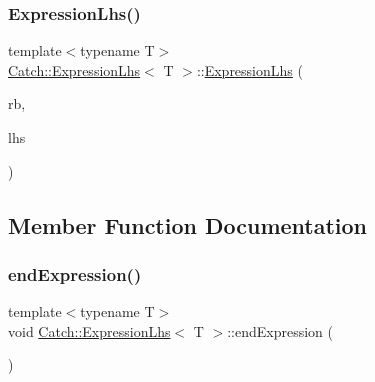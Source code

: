 \subsubsection{\texorpdfstring{Expression\+Lhs()}{ExpressionLhs()}}
{\footnotesize\ttfamily template$<$typename T$>$ \\
\hyperlink{class_catch_1_1_expression_lhs}{Catch\+::\+Expression\+Lhs}$<$ T $>$\+::\hyperlink{class_catch_1_1_expression_lhs}{Expression\+Lhs} (\begin{DoxyParamCaption}\item[{\hyperlink{class_catch_1_1_result_builder}{Result\+Builder} \&}]{rb,  }\item[{T}]{lhs }\end{DoxyParamCaption})\hspace{0.3cm}{\ttfamily [inline]}}



\subsection{Member Function Documentation}
\mbox{\label{class_catch_1_1_expression_lhs_a13d2551a927790284fb5ddf1ee2c9079}} 
\subsubsection{\texorpdfstring{end\+Expression()}{endExpression()}}
{\footnotesize\ttfamily template$<$typename T$>$ \\
void \hyperlink{class_catch_1_1_expression_lhs}{Catch\+::\+Expression\+Lhs}$<$ T $>$\+::end\+Expression (\begin{DoxyParamCaption}{ }\end{DoxyParamCaption})\hspace{0.3cm}{\ttfamily [inline]}}

\mbox{\label{class_catch_1_1_expression_lhs_a3bc08bb2b9c27678e2628faa73645144}} 
